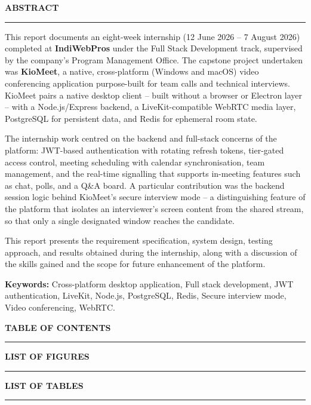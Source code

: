 \documentclass[12pt,oneside,a4paper]{report}
\newcommand{\rfrontheading}[1]{%
  \begin{center}
    {\fontsize{14}{17}\selectfont\bfseries #1\par}
  \end{center}
  \noindent\rule{\textwidth}{0.8pt}\par\vspace{10pt}
}
\begin{document}
\clearpage
\rfrontheading{ABSTRACT}
\noindent
This report documents an eight-week internship (12 June 2026 -- 7 August
2026) completed at \textbf{IndiWebPros} under the Full Stack Development
track, supervised by the company's Program Management Office. The capstone
project undertaken was \textbf{KioMeet}, a native, cross-platform (Windows
and macOS) video conferencing application purpose-built for team calls and
technical interviews. KioMeet pairs a native desktop client -- built without
a browser or Electron layer -- with a Node.js/Express backend, a
LiveKit-compatible WebRTC media layer, PostgreSQL for persistent data, and
Redis for ephemeral room state.

The internship work centred on the backend and full-stack concerns of the
platform: JWT-based authentication with rotating refresh tokens, tier-gated
access control, meeting scheduling with calendar synchronisation, team
management, and the real-time signalling that supports in-meeting features
such as chat, polls, and a Q\&A board. A particular contribution was the
backend session logic behind KioMeet's secure interview mode -- a
distinguishing feature of the platform that isolates an interviewer's screen
content from the shared stream, so that only a single designated window
reaches the candidate.

This report presents the requirement specification, system design, testing
approach, and results obtained during the internship, along with a
discussion of the skills gained and the scope for future enhancement of the
platform.

\vspace{0.4cm}
\noindent\textbf{Keywords:} Cross-platform desktop application, Full stack
development, JWT authentication, LiveKit, Node.js, PostgreSQL, Redis,
Secure interview mode, Video conferencing, WebRTC.

\makeatletter
\clearpage
\rfrontheading{TABLE OF CONTENTS}

\clearpage
\rfrontheading{LIST OF FIGURES}

\clearpage
\rfrontheading{LIST OF TABLES}
\makeatother
\end{document}
